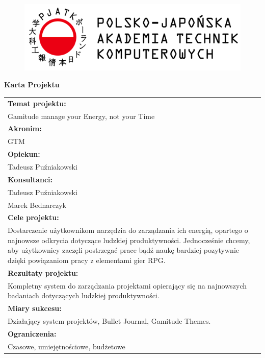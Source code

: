\documentclass[a4paper,11pt]{report}
\begin{document}
\let\cleardoublepage\clearpage
\begin{figure}[ht]
\centering
\includegraphics{pjatk}
\end{figure}
\begin{center}
\textbf{\huge Karta Projektu}\\
\vspace{1cm}
\begin{tabular}{|p{15cm}|}
\hline
\textbf{Temat projektu:}\\Gamitude manage your Energy, not your Time\\ 
\hline
\textbf{Akronim:}\\GTM\\
\hline
\textbf{Opiekun:}\\Tadeusz Puźniakowski  \\
\hline
\textbf{Konsultanci:}\\Tadeusz Puźniakowski\\Marek Bednarczyk \\
\hline
\textbf{Cele projektu:}
\\Dostarczenie użytkownikom narzędzia do zarządzania ich energią,
 opartego o najnowsze odkrycia dotyczące ludzkiej produktywności.
Jednocześnie chcemy,
 aby użytkownicy zaczęli postrzegać prace bądź naukę bardziej pozytywnie dzięki powiązaniom pracy z elementami gier RPG.\\
\hline
\textbf{Rezultaty projektu:}\\Kompletny system do zarządzania projektami opierający się na najnowszych badaniach dotyczących ludzkiej produktywności. \\
\hline
\textbf{Miary sukcesu:}\\Działający system projektów, Bullet Journal, Gamitude Themes.\\
\hline
\textbf{Ograniczenia:}\\Czasowe, umiejętnościowe, budżetowe \\
\hline
\end{tabular}\\
\vspace{1cm}
\begin{tabular}{|l|l|l|l|}

\end{tabular}
\end{center}
\end{document}
